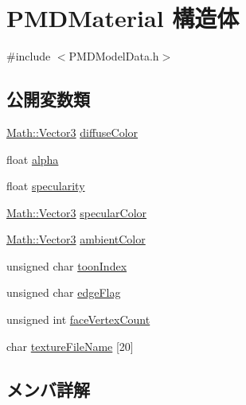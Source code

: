 \hypertarget{struct_p_m_d_material}{}\section{P\+M\+D\+Material 構造体}
\label{struct_p_m_d_material}


{\ttfamily \#include $<$P\+M\+D\+Model\+Data.\+h$>$}

\subsection*{公開変数類}
\begin{DoxyCompactItemize}
\item 
\mbox{\hyperlink{struct_math_1_1_vector3}{Math\+::\+Vector3}} \mbox{\hyperlink{struct_p_m_d_material_a54704ea8dae07fba8676ca8e789725ef}{diffuse\+Color}}
\item 
float \mbox{\hyperlink{struct_p_m_d_material_afd9bbe21451115c1acd8bc9702085eb4}{alpha}}
\item 
float \mbox{\hyperlink{struct_p_m_d_material_a906fbbbac3f0e8bf814e9872a3002b79}{specularity}}
\item 
\mbox{\hyperlink{struct_math_1_1_vector3}{Math\+::\+Vector3}} \mbox{\hyperlink{struct_p_m_d_material_af6164a316f25079cd167c09ca42a6db0}{specular\+Color}}
\item 
\mbox{\hyperlink{struct_math_1_1_vector3}{Math\+::\+Vector3}} \mbox{\hyperlink{struct_p_m_d_material_ae5cdea3aceddcf4482e3dd78dea2f22a}{ambient\+Color}}
\item 
unsigned char \mbox{\hyperlink{struct_p_m_d_material_a6cd58473cb562314ae2be7340401e04c}{toon\+Index}}
\item 
unsigned char \mbox{\hyperlink{struct_p_m_d_material_a611ebccce5aa27a26891672b9699d3c9}{edge\+Flag}}
\item 
unsigned int \mbox{\hyperlink{struct_p_m_d_material_a350b72e459712e47f01e250d1b483e8b}{face\+Vertex\+Count}}
\item 
char \mbox{\hyperlink{struct_p_m_d_material_a2e15dee3872f9eb6a039d76b76b3a20e}{texture\+File\+Name}} \mbox{[}20\mbox{]}
\end{DoxyCompactItemize}


\subsection{メンバ詳解}
\mbox{\label{struct_p_m_d_material_afd9bbe21451115c1acd8bc9702085eb4}} 
